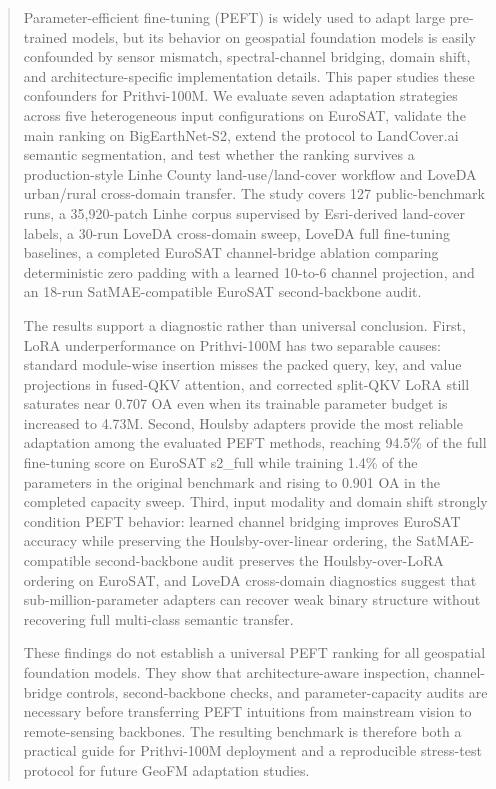 \begin{abstract}
Parameter-efficient fine-tuning (PEFT) is widely used to adapt large pre-trained models, but its behavior on geospatial foundation models is easily confounded by sensor mismatch, spectral-channel bridging, domain shift, and architecture-specific implementation details. This paper studies these confounders for Prithvi-100M. We evaluate seven adaptation strategies across five heterogeneous input configurations on EuroSAT, validate the main ranking on BigEarthNet-S2, extend the protocol to LandCover.ai semantic segmentation, and test whether the ranking survives a production-style Linhe County land-use/land-cover workflow and LoveDA urban/rural cross-domain transfer. The study covers 127 public-benchmark runs, a 35{,}920-patch Linhe corpus supervised by Esri-derived land-cover labels, a 30-run LoveDA cross-domain sweep, LoveDA full fine-tuning baselines, a completed EuroSAT channel-bridge ablation comparing deterministic zero padding with a learned 10-to-6 channel projection, and an 18-run SatMAE-compatible EuroSAT second-backbone audit.

The results support a diagnostic rather than universal conclusion. First, LoRA underperformance on Prithvi-100M has two separable causes: standard module-wise insertion misses the packed query, key, and value projections in fused-QKV attention, and corrected split-QKV LoRA still saturates near 0.707 OA even when its trainable parameter budget is increased to 4.73M. Second, Houlsby adapters provide the most reliable adaptation among the evaluated PEFT methods, reaching 94.5\% of the full fine-tuning score on EuroSAT s2\_full while training 1.4\% of the parameters in the original benchmark and rising to 0.901 OA in the completed capacity sweep. Third, input modality and domain shift strongly condition PEFT behavior: learned channel bridging improves EuroSAT accuracy while preserving the Houlsby-over-linear ordering, the SatMAE-compatible second-backbone audit preserves the Houlsby-over-LoRA ordering on EuroSAT, and LoveDA cross-domain diagnostics suggest that sub-million-parameter adapters can recover weak binary structure without recovering full multi-class semantic transfer.

These findings do not establish a universal PEFT ranking for all geospatial foundation models. They show that architecture-aware inspection, channel-bridge controls, second-backbone checks, and parameter-capacity audits are necessary before transferring PEFT intuitions from mainstream vision to remote-sensing backbones. The resulting benchmark is therefore both a practical guide for Prithvi-100M deployment and a reproducible stress-test protocol for future GeoFM adaptation studies.
\end{abstract}

